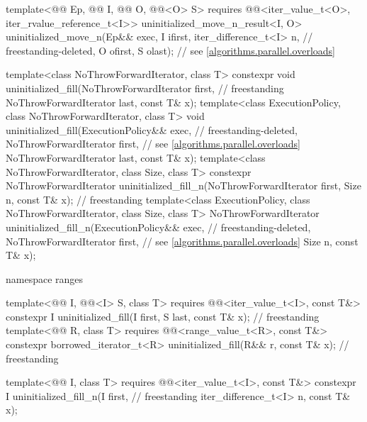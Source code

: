 \begin{codeblock}
{{    template<@@ Ep, @@ I,
             @@ O, @@<O> S>
      requires @@<iter_value_t<O>, iter_rvalue_reference_t<I>>
        uninitialized_move_n_result<I, O>
          uninitialized_move_n(Ep&& exec, I ifirst, iter_difference_t<I> n, // freestanding-deleted,
                               O ofirst, S olast);                          // see \ref{algorithms.parallel.overloads}
  }

  template<class NoThrowForwardIterator, class T>
    constexpr void uninitialized_fill(NoThrowForwardIterator first,                 // freestanding
                                      NoThrowForwardIterator last, const T& x);
  template<class ExecutionPolicy, class NoThrowForwardIterator, class T>
    void uninitialized_fill(ExecutionPolicy&& exec,                         // freestanding-deleted,
                            NoThrowForwardIterator first,                   // see \ref{algorithms.parallel.overloads}
                            NoThrowForwardIterator last,
                            const T& x);
  template<class NoThrowForwardIterator, class Size, class T>
    constexpr NoThrowForwardIterator
      uninitialized_fill_n(NoThrowForwardIterator first, Size n, const T& x);       // freestanding
  template<class ExecutionPolicy, class NoThrowForwardIterator, class Size, class T>
    NoThrowForwardIterator
      uninitialized_fill_n(ExecutionPolicy&& exec,                          // freestanding-deleted,
                           NoThrowForwardIterator first,                    // see \ref{algorithms.parallel.overloads}
                           Size n, const T& x);

  namespace ranges {
    template<@@ I, @@<I> S, class T>
      requires @@<iter_value_t<I>, const T&>
        constexpr I uninitialized_fill(I first, S last, const T& x);                // freestanding
    template<@@ R, class T>
      requires @@<range_value_t<R>, const T&>
        constexpr borrowed_iterator_t<R> uninitialized_fill(R&& r, const T& x);     // freestanding

    template<@@ I, class T>
      requires @@<iter_value_t<I>, const T&>
        constexpr I uninitialized_fill_n(I first,                                   // freestanding
                                         iter_difference_t<I> n, const T& x);

}}
\end{codeblock}
